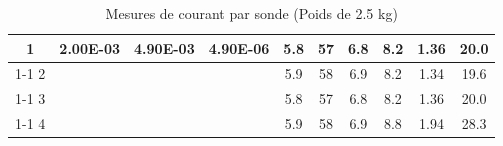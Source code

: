 \begin{table}[H]
{\begin{tabular}{|c|c|c|c|c|c|c|c|c|c|}
            1         & \multirow{4}{*}{2.00E-03}                                  & \multirow{4}{*}{4.90E-03} & \multirow{4}{*}{4.90E-06}                               & 5.8                                                      & 57                                                      & 6.8                                                                 & 8.2                                                              & 1.36   & 20.0                                                               \\ \cline{1-1} \cline{5-10}
            2         &                                                            &                           &                                                         & 5.9                                                      & 58                                                      & 6.9                                                                 & 8.2                                                              & 1.34   & 19.6                                                               \\ \cline{1-1} \cline{5-10}
            3         &                                                            &                           &                                                         & 5.8                                                      & 57                                                      & 6.8                                                                 & 8.2                                                              & 1.36   & 20.0                                                               \\ \cline{1-1} \cline{5-10}
            4         &                                                            &                           &                                                         & 5.9                                                      & 58                                                      & 6.9                                                                 & 8.8                                                              & 1.94   & 28.3                                                               \\ \hline
        \end{tabular}%
    }
    \caption{Mesures de courant par sonde (Poids de 2.5 kg)}
    \label{tab:poids_2_5_sonde}
\end{table}

